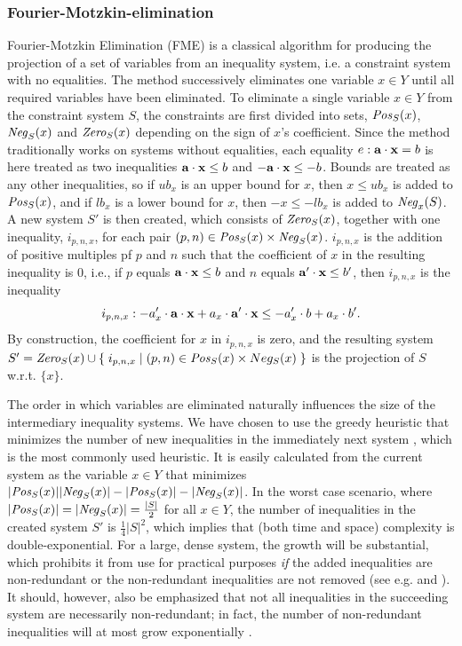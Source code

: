 \subsubsection{Fourier-Motzkin-elimination} 
Fourier-Motzkin Elimination (FME) is a classical algorithm for producing the projection of a set of variables from an inequality system, i.e. a constraint system with no equalities. The method successively eliminates one variable $x\in Y$ until all required variables have been eliminated. To eliminate a single variable $x\in Y$ from the constraint system $S$, the constraints are first divided into sets, $\mathit{Pos}_S(x)$, $\mathit{Neg}_S(x)$ and $\mathit{Zero}_S(x)$ depending on the sign of $x$'s coefficient. Since the method traditionally works on systems without equalities, each equality $e: \mathbf{a}\cdot\mathbf{x} = b$ is here treated as two inequalities $\mathbf{a}\cdot\mathbf{x} \leq b$ and $-\mathbf{a}\cdot\mathbf{x} \leq -b$. Bounds are treated as any other inequalities, so if $ub_x$ is an upper bound for $x$, then $x\leq ub_x$ is added to $\mathit{Pos}_S(x)$, and if $lb_x$ is a lower bound for $x$, then $-x\leq - lb_x$ is added to $\mathit{Neg}_x(S)$. A new system $S'$ is then created, which consists of $\mathit{Zero}_S(x)$, together with one inequality, $i_{p,n,x}$, for each pair $(p,n)\in \mathit{Pos}_S(x)\times \mathit{Neg}_S(x)$. $i_{p,n,x}$ is the addition of positive multiples pf $p$ and $n$ such that the coefficient of $x$ in the resulting inequality is $0$, i.e., if $p$ equals $\mathbf{a}\cdot\mathbf{x} \leq b$ and $n$ equals $\mathbf{a}'\cdot\mathbf{x} \leq b'$, then $i_{p,n,x}$ is the inequality 
\[
i_{p,n,x}: -a'_x\cdot \mathbf{a}\cdot\mathbf{x} + a_x\cdot \mathbf{a}'\cdot\mathbf{x} \leq -a'_x\cdot b + a_x\cdot b'.
\]
By construction, the coefficient for $x$ in $i_{p,n,x}$ is zero, and the resulting system $S' = \mathit{Zero}_S(x) \cup\\
\{\;{i_{p,n,x}}\;|\;{(p,n)\in \mathit{Pos}_S(x)\times Neg_S(x)}\;\}$ is the projection of $S$ w.r.t. $\{x\}$.  

The order in which variables are eliminated naturally influences the size of the intermediary inequality systems. We have chosen to use the greedy heuristic {that minimizes the number of new inequalities in the immediately next system \cite{duffin74}}, which is the most commonly used heuristic. It is easily calculated from the current system as the variable $x\in Y$ that minimizes $|\mathit{Pos}_S(x)||\mathit{Neg}_S(x)| - |\mathit{Pos}_S(x)|-|\mathit{Neg}_S(x)|$.  In the worst case scenario, where $|\mathit{Pos}_S(x)| = |\mathit{Neg}_S(x)| = \frac{|S|}{2}$ for all $x\in Y$, the number of inequalities in the created system $S'$ is $\frac{1}{4}|S|^2$, which implies that (both time and space) complexity is double-exponential. For a large, dense system, the growth will be substantial, which prohibits it from use for practical purposes \emph{if} the added inequalities are non-redundant or the non-redundant inequalities are not removed ({see e.g. \cite{lassez93} and \cite{lukatskii08}}). It should, however, also be emphasized that not all inequalities in the succeeding system are necessarily non-redundant; in fact, the number of non-redundant inequalities will at most grow exponentially \cite{monniaux10}.

